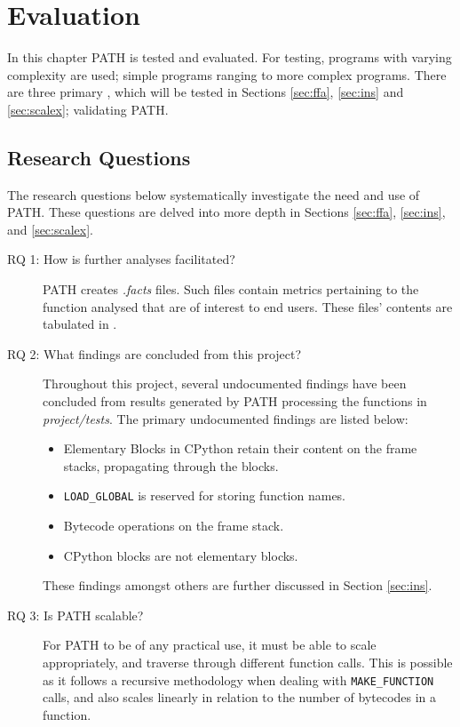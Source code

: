 \chapter{Evaluation}
    In this chapter \acs{PATH} is tested and evaluated. For testing, programs with varying complexity are used; simple programs ranging to more complex programs. 
    There are three primary , which will be tested in Sections \ref{sec:ffa}, \ref{sec:ins} and \ref{sec:scalex}; validating \acs{PATH}.

    \section{Research Questions}
    \label{sec:researchque}
        The research questions below systematically investigate the need and use of \acs{PATH}. These questions are delved into more depth in Sections \ref{sec:ffa}, \ref{sec:ins}, and \ref{sec:scalex}.
        
        \begin{description}
            \item[RQ 1: How is further analyses facilitated?] \acs{PATH} creates \textit{.facts} files. Such files contain metrics pertaining to the function analysed that are of interest to end users.
            These files' contents are tabulated in .
            \item[RQ 2: What findings are concluded from this project?] Throughout this project, several undocumented findings have been concluded from results generated by \acs{PATH} processing the functions in \textit{project/tests}.
                The primary undocumented findings are listed below:
                \begin{itemize}
                    \item Elementary Blocks in CPython retain their content on the frame stacks, propagating through the blocks.
                    \item \lstinline|LOAD_GLOBAL| is reserved for storing function names.
                    \item Bytecode operations on the frame stack. 
                    \item CPython blocks are not elementary blocks.
                \end{itemize}
                These findings amongst others are further discussed in Section \ref{sec:ins}.
            
            \item[RQ 3: Is \acs{PATH} scalable?] For \acs{PATH} to be of any practical use, it must be able to scale appropriately, and traverse through different function calls.  
            This is possible as it follows a recursive methodology when dealing with \lstinline|MAKE_FUNCTION| calls, and also scales linearly in relation to the number of bytecodes in a function.

        \end{description}

